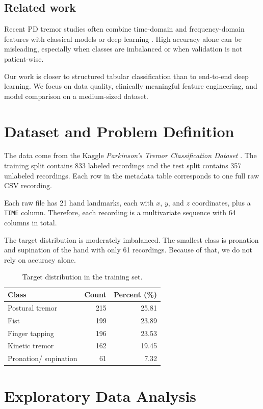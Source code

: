 \documentclass[10pt,twocolumn]{article}
\begin{document}
\subsection{Related work}
Recent PD tremor studies often combine time-domain and frequency-domain features with classical models or deep learning \citep{channa2022,paucar2025}. High accuracy alone can be misleading, especially when classes are imbalanced or when validation is not patient-wise.

Our work is closer to structured tabular classification than to end-to-end deep learning. We focus on data quality, clinically meaningful feature engineering, and model comparison on a medium-sized dataset.

\section{Dataset and Problem Definition}
The data come from the Kaggle \emph{Parkinson's Tremor Classification Dataset} \citep{kagglepd}. The training split contains 833 labeled recordings and the test split contains 357 unlabeled recordings. Each row in the metadata table corresponds to one full raw CSV recording.

Each raw file has 21 hand landmarks, each with $x$, $y$, and $z$ coordinates, plus a \texttt{TIME} column. Therefore, each recording is a multivariate sequence with 64 columns in total.

The target distribution is moderately imbalanced. The smallest class is pronation and supination of the hand with only 61 recordings. Because of that, we do not rely on accuracy alone.

\begin{table}[H]
\centering
\caption{Target distribution in the training set.}
\label{tab:class-dist-short}
\begin{tabular}{lrr}
\toprule
Class & Count & Percent (\%) \\
\midrule
Postural tremor & 215 & 25.81 \\
Fist & 199 & 23.89 \\
Finger tapping & 196 & 23.53 \\
Kinetic tremor & 162 & 19.45 \\
Pronation/ supination & 61 & 7.32 \\
\bottomrule
\end{tabular}
\end{table}

\section{Exploratory Data Analysis}
\end{document}
